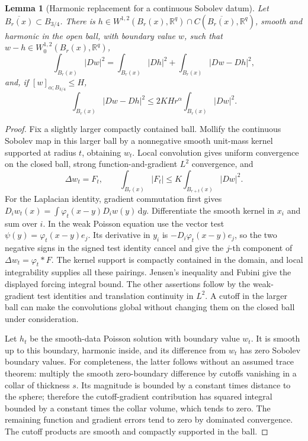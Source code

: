 \documentclass[11pt,a4paper]{article}
\numberwithin{equation}{section}
\newtheorem{lemma}[theorem]{Lemma}
\theoremstyle{definition}
\theoremstyle{remark}
\newcommand{\R}{\mathbb R}
\newcommand{\dd}{\,\mathrm d}
\newcommand{\dy}{\dd y}
\begin{document}
\begin{lemma}[Harmonic replacement for a continuous Sobolev datum]
\label{lem:replacement}
Let \(\overline{B_r(x)}\subset B_{3/4}\). There is
\(h\in W^{1,2}(B_r(x),\R^q)\cap C(\overline{B_r(x)},\R^q)\),
smooth and harmonic in the open ball, with boundary value \(w\), such that
\(w-h\in W^{1,2}_0(B_r(x),\R^q)\),
\begin{equation}\label{eq:orthogonal}
 \int_{B_r(x)}|Dw|^2
 =\int_{B_r(x)}|Dh|^2+\int_{B_r(x)}|Dw-Dh|^2,
\end{equation}
and, if \([w]_{\alpha;B_{3/4}}\le H\),
\begin{equation}\label{eq:error}
 \int_{B_r(x)}|Dw-Dh|^2
 \le 2KHr^\alpha\int_{B_r(x)}|Dw|^2.
\end{equation}
\end{lemma}
\begin{proof}
Fix a slightly larger compactly contained ball. Mollify the continuous
Sobolev map in this larger ball by a nonnegative smooth unit-mass kernel
supported at radius \(t\), obtaining \(w_t\). Local convolution gives
uniform convergence on the closed ball, strong function-and-gradient
\(L^2\) convergence, and
\begin{equation}\label{eq:mollpoisson}
 \Delta w_t=F_t,\qquad
 \int_{B_r(x)}|F_t|\le K\int_{B_{r+t}(x)}|Dw|^2.
\end{equation}
For the Laplacian identity, gradient commutation first gives
\(D_iw_t(x)=\int\varphi_t(x-y)D_iw(y)\dy\).
Differentiate the smooth kernel in \(x_i\) and sum over \(i\).
In the weak Poisson equation use the vector test
\(\psi(y)=\varphi_t(x-y)e_j\). Its derivative in \(y_i\) is
\(-D_i\varphi_t(x-y)e_j\), so the two negative signs in the signed test
identity cancel and give the \(j\)-th component of
\(\Delta w_t=\varphi_t*F\). The kernel support is compactly contained
in the domain, and local integrability supplies all these pairings.
Jensen's inequality and Fubini give the displayed forcing integral bound.
The other assertions follow by the weak-gradient test identities and
translation continuity in \(L^2\). A cutoff in the larger ball can make the convolutions
global without changing them on the closed ball under consideration.

Let \(h_t\) be the smooth-data Poisson solution with boundary value
\(w_t\). It is smooth up to this boundary, harmonic inside, and its
difference from \(w_t\) has zero Sobolev boundary values. For completeness,
the latter follows without an assumed trace theorem: multiply the smooth
zero-boundary difference by cutoffs vanishing in a collar of thickness
\(s\). Its magnitude is bounded by a constant times distance to the sphere;
therefore the cutoff-gradient contribution has squared integral bounded
by a constant times the collar volume, which tends to zero. The remaining
function and gradient errors tend to zero by dominated convergence. The
cutoff products are smooth and compactly supported in the ball.


\end{proof}
\end{document}
